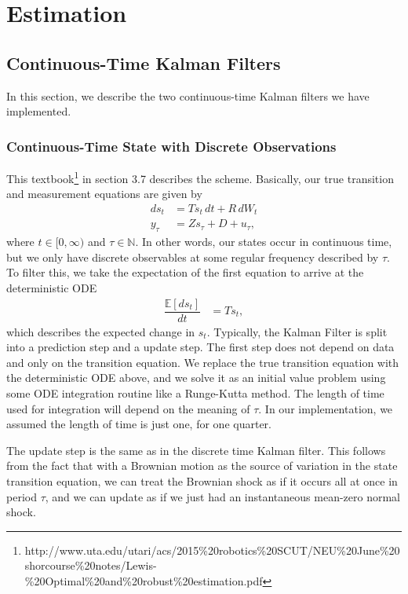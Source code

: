 \documentclass[12 pt, oneside]{article}
\theoremstyle{definition}
\theoremstyle{definition}
\theoremstyle{definition}
\newcommand{\E}{\mathbb{E}}
\newcommand{\N}{\mathbb{N}}
\begin{document}
\section{Estimation}
\subsection{Continuous-Time Kalman Filters}
In this section, we describe the two continuous-time Kalman filters we have implemented.

\subsubsection{Continuous-Time State with Discrete Observations}
This textbook\footnote{http://www.uta.edu/utari/acs/2015\%20robotics\%20SCUT/NEU\%20June\%20shorcourse\%20notes/Lewis-\%20Optimal\%20and\%20robust\%20estimation.pdf} in section 3.7 describes the scheme. Basically, our true transition and measurement equations are given by
\begin{align*}
  ds_t & = Ts_t\,dt + R\, dW_t\\
  y_\tau & = Zs_\tau + D + u_\tau,
\end{align*}
where $t\in [0,\infty)$ and $\tau \in \N$. In other words, our states occur in continuous time, but we only have discrete observables at some regular frequency described by $\tau$. To filter this, we take the expectation of the first equation to arrive at the deterministic ODE
\begin{align*}
  \dfrac{\E[ds_t]}{dt} & = Ts_t,
\end{align*}
which describes the expected change in $s_t$. Typically, the Kalman Filter is split into a prediction step and a update step. The first step does not depend on data and only on the transition equation. We replace the true transition equation with the deterministic ODE above, and we solve it as an initial value problem using some ODE integration routine like a Runge-Kutta method. The length of time used for integration will depend on the meaning of $\tau$. In our implementation, we assumed the length of time is just one, for one quarter.

The update step is the same as in the discrete time Kalman filter. This follows from the fact that with a Brownian motion as the source of variation in the state transition equation, we can treat the Brownian shock as if it occurs all at once in period $\tau$, and we can update as if we just had an instantaneous mean-zero normal shock.
\end{document}
